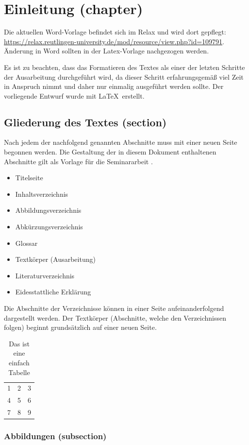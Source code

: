 \chapter{Einleitung (chapter)}
Die aktuellen Word-Vorlage befindet sich im Relax und wird dort gepflegt: \url{https://relax.reutlingen-university.de/mod/resource/view.php?id=109791}. Änderung in Word sollten in der  Latex-Vorlage nachgezogen werden.

Es ist zu beachten, dass das Formatieren des Textes als einer der letzten
Schritte der Ausarbeitung durchgeführt wird, da dieser Schritt erfahrungsgemäß viel Zeit in Anspruch nimmt und daher nur einmalig ausgeführt werden sollte.
Der vorliegende Entwurf wurde mit \LaTeX ~erstellt.

\section{Gliederung des Textes (section)}
Nach jedem der nachfolgend genannten Abschnitte muss mit einer neuen
Seite begonnen werden. Die Gestaltung der in diesem Dokument
enthaltenen Abschnitte gilt als Vorlage für die Seminararbeit \cite{BlindBuch}.
\begin{itemize}
\item Titelseite
\item Inhaltsverzeichnis
\item Abbildungsverzeichnis
\item Abkürzungsverzeichnis
\item Glossar
\item Textkörper (Ausarbeitung)
\item Literaturverzeichnis
\item Eidesstattliche Erklärung
\end{itemize}
Die Abschnitte der Verzeichnisse können in einer Seite aufeinanderfolgend dargestellt werden. Der Textkörper (Abschnitte, welche den Verzeichnissen folgen) beginnt grundsätzlich auf einer neuen Seite.

\begin{table}
\begin{tabular}{ l c r }
  1 & 2 & 3 \\
  4 & 5 & 6 \\
  7 & 8 & 9 \\
\end{tabular}
\caption{Das ist eine einfach Tabelle}
\label{tab:tabelle1}
\end{table}
 
\subsection{Abbildungen (subsection)}
 \lipsum[1]
 
